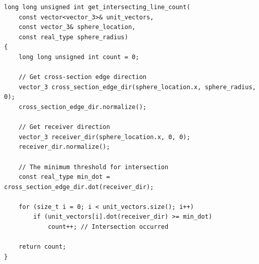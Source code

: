 \documentclass[12pt]{article}
\begin{document}
\begin{lstlisting}
long long unsigned int get_intersecting_line_count(
	const vector<vector_3>& unit_vectors,
	const vector_3& sphere_location,
	const real_type sphere_radius)
{
	long long unsigned int count = 0;

	// Get cross-section edge direction
	vector_3 cross_section_edge_dir(sphere_location.x, sphere_radius, 0);
	cross_section_edge_dir.normalize();

	// Get receiver direction
	vector_3 receiver_dir(sphere_location.x, 0, 0);
	receiver_dir.normalize();

	// The minimum threshold for intersection
	const real_type min_dot = cross_section_edge_dir.dot(receiver_dir);

	for (size_t i = 0; i < unit_vectors.size(); i++)
		if (unit_vectors[i].dot(receiver_dir) >= min_dot)
			count++; // Intersection occurred

	return count;
}
\end{lstlisting}
\end{document}
